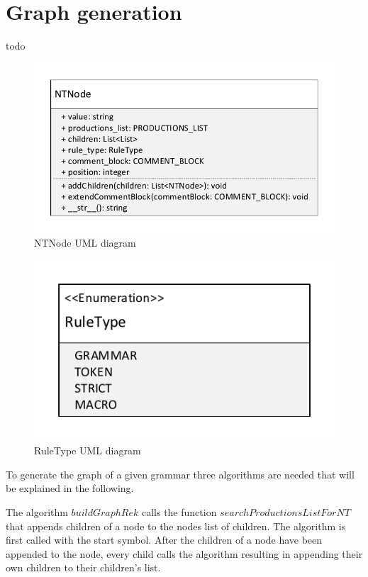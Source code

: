 \section{Graph generation}\label{sec:ImplementationGraphGeneration}
todo
\begin{figure}[H]
\centering
\includegraphics[width=1\textwidth]{images/uml_data_types_NTNode.pdf}
\caption{NTNode UML diagram}
\label{fig:ImplementationNTNodeUML}
\end{figure}

\begin{figure}[H]
\centering
\includegraphics[width=.7\textwidth]{images/uml_data_types_rule_type.pdf}
\caption{RuleType UML diagram}
\label{fig:ImplementationRuleTypeUML}
\end{figure}

To generate the graph of a given grammar three algorithms are needed that will be explained in the following.

The algorithm $buildGraphRek$ calls the function $searchProductionsListForNT$ that appends children of a node to the nodes list of children.
The algorithm is first called with the start symbol.
After the children of a node have been appended to the node, every child calls the algorithm resulting in appending their own children to their children's list.

